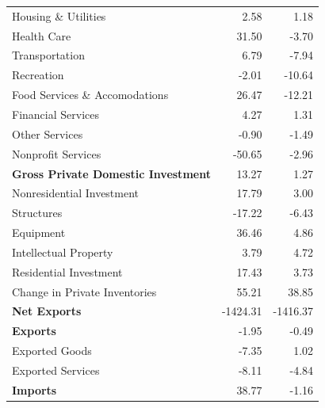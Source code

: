 \documentclass[11pt, letterpaper]{article}\usepackage[]{graphicx}\usepackage[]{color}
\begin{document}
\begin{table}[H]
\begin{tabular}{lrr}
  \hspace{16mm}  Housing \& Utilities & 2.58 & 1.18 \\ 
  \hspace{16mm}  Health Care & 31.50 & -3.70 \\ 
  \hspace{16mm}  Transportation & 6.79 & -7.94 \\ 
  \hspace{16mm}  Recreation & -2.01 & -10.64 \\ 
  \hspace{16mm}  Food Services \& Accomodations & 26.47 & -12.21 \\ 
  \hspace{16mm}  Financial Services & 4.27 & 1.31 \\ 
  \hspace{16mm}  Other Services & -0.90 & -1.49 \\ 
  \hspace{16mm}  Nonprofit Services & -50.65 & -2.96 \\ 
  \hspace{0mm} \textbf{Gross Private Domestic Investment} & 13.27 & 1.27 \\ 
  \hspace{8mm}  Nonresidential Investment & 17.79 & 3.00 \\ 
  \hspace{16mm}  Structures & -17.22 & -6.43 \\ 
  \hspace{16mm}  Equipment & 36.46 & 4.86 \\ 
  \hspace{16mm}  Intellectual Property & 3.79 & 4.72 \\ 
  \hspace{8mm}  Residential Investment & 17.43 & 3.73 \\ 
  \hspace{8mm}  Change in Private Inventories & 55.21 & 38.85 \\ 
  \hspace{0mm} \textbf{Net Exports} & -1424.31 & -1416.37 \\ 
  \hspace{0mm} \textbf{Exports} & -1.95 & -0.49 \\ 
  \hspace{8mm}  Exported Goods & -7.35 & 1.02 \\ 
  \hspace{8mm}  Exported Services & -8.11 & -4.84 \\ 
  \hspace{0mm} \textbf{Imports} & 38.77 & -1.16 \\ 

\end{tabular}
\end{table}
\end{document}
